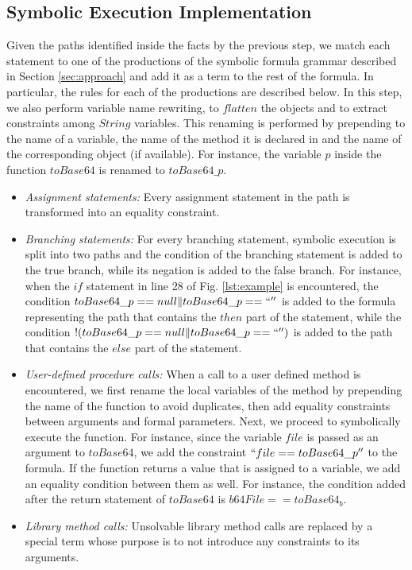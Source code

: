 
\subsection{Symbolic Execution Implementation}
Given the paths identified inside the facts by the previous step, we match each statement to one of the productions of the symbolic formula grammar described in Section \ref{sec:approach} and add it as a term to the rest of the formula. In particular, the rules for each of the productions are described below. {\color{orange} In this step, we also perform variable name rewriting, to $flatten$ the objects and to extract constraints among $String$ variables. This renaming is performed by prepending to the name of a variable, the name of the method it is declared in and the name of the corresponding object (if available). For instance, the variable $p$ inside the function $toBase64$ is renamed to $toBase64\_p$.} 
\begin{itemize}
\item \textit{Assignment statements:} Every assignment statement in the path is transformed into an equality constraint.
\item \textit{Branching statements:} For every branching statement, symbolic execution is split into two paths and the condition of the branching statement is added to the true branch, while its negation is added to the false branch.
For instance, when the $if$ statement in line 28 of Fig. \ref{lst:example} is encountered, the condition $toBase64\_p==null \| toBase64\_p==``''$ is added to the formula representing the path that contains the $then$ part of the statement, while the condition $!(toBase64\_p==null \| toBase64\_p==``'')$ is added to the path that contains the $else$ part of the statement.
\item \textit{User-defined procedure calls:} When a call to a user defined method is encountered, we first rename the local variables of the method by prepending the name of the function to avoid duplicates, then add equality constraints between arguments and formal parameters. Next, we proceed to symbolically execute the function. For instance, since the variable $file$ is passed as an argument to $toBase64$, we add the constraint $``file == toBase64\_p''$ to the formula. If the function returns a value that is assigned to a variable, we add an equality condition between them as well. For instance, the condition added after the return statement of $toBase64$ is $b64File==toBase64_b$.
\item \textit{Library method calls:} Unsolvable library method calls are replaced by a special term whose purpose is to not introduce any constraints to its arguments. 
\end{itemize}

